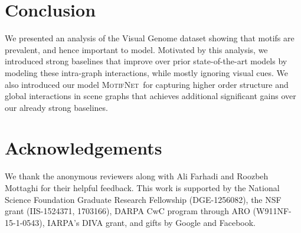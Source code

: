 \documentclass[10pt,twocolumn,letterpaper]{article}
\newcommand{\model}{\textsc{MotifNet}}
\begin{document}
\section{Conclusion}
\label{sec:conclusion}
We presented an analysis of the Visual Genome dataset showing that motifs are prevalent, and hence important to model.
Motivated by this analysis, we introduced strong baselines 
that improve over prior state-of-the-art models by modeling these intra-graph interactions, while mostly ignoring visual cues.
We also introduced our model \model~for capturing higher order structure and global interactions in scene graphs that achieves additional significant gains over our already strong baselines.


\section*{Acknowledgements}
\label{sec:acknowledgements}
We thank the anonymous reviewers along with Ali Farhadi and Roozbeh Mottaghi for their helpful feedback. This work is supported by the National Science Foundation Graduate Research Fellowship (DGE-1256082), the NSF grant (IIS-1524371, 1703166), DARPA CwC program through ARO (W911NF-15-1-0543), IARPA's DIVA grant, and gifts by Google and Facebook.
\end{document}
